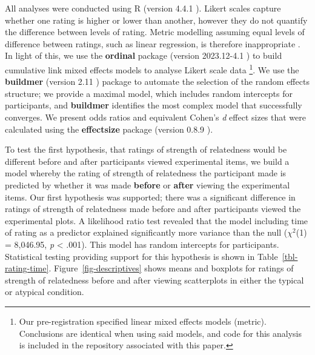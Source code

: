 \documentclass[manuscript,screen,review,anonymous]{acmart}
\begin{document}
All analyses were conducted using R (version 4.4.1 \citep{rcore}).
Likert scales capture whether one rating is higher or lower than
another, however they do not quantify the difference between levels of
rating. Metric modelling assuming equal levels of difference between
ratings, such as linear regression, is therefore inappropriate
\citep{liddell_2018}. In light of this, we use the \textbf{ordinal}
package (version 2023.12-4.1 \citep{ordinal}) to build cumulative link
mixed effects models to analyse Likert scale data \footnote{Our
  pre-registration specified linear mixed effects models (metric).
  Conclusions are identical when using said models, and code for this
  analysis is included in the repository associated with this paper.}.
We use the \textbf{buildmer} (version 2.11 \citep{buildmer}) package to
automate the selection of the random effects structure; we provide a
maximal model, which includes random intercepts for participants, and
\textbf{buildmer} identifies the most complex model that successfully
converges. We present odds ratios and equivalent Cohen's \emph{d} effect
sizes that were calculated using the \textbf{effectsize} package
(version 0.8.9 \citep{effectsize}).

To test the first hypothesis, that ratings of strength of relatedness
would be different before and after participants viewed experimental
items, we build a model whereby the rating of strength of relatedness
the participant made is predicted by whether it was made \textbf{before}
or \textbf{after} viewing the experimental items. Our first hypothesis
was supported; there was a significant difference in ratings of strength
of relatedness made before and after participants viewed the
experimental plots. A likelihood ratio test revealed that the model
including time of rating as a predictor explained significantly more
variance than the null (\(\chi^2\)(1) = 8,046.95, \emph{p} \textless{}
.001). This model has random intercepts for participants. Statistical
testing providing support for this hypothesis is shown in
Table~\ref{tbl-rating-time}. Figure~\ref{fig-descriptives} shows means
and boxplots for ratings of strength of relatedness before and after
viewing scatterplots in either the typical or atypical condition.

\begin{table}

\caption{\label{tbl-rating-time}Statistics for the significant main
effect of rating time. Odds ratio and the equivalent Cohen's \textit{d}
value is also supplied.}


\end{table}%
\end{document}
